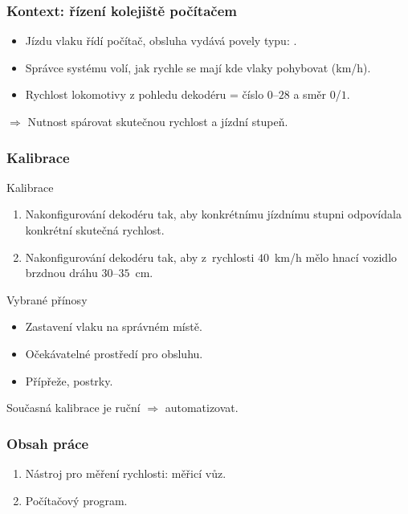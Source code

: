\documentclass[aspectratio=169]{beamer}
\begin{document}

\begin{frame}
\frametitle{Kontext: řízení kolejiště počítačem}
\begin{itemize}
\item Jízdu vlaku řídí počítač, obsluha vydává povely typu: .
\item Správce systému volí, jak rychle se mají kde vlaky pohybovat (km/h).
\item Rychlost lokomotivy z pohledu dekodéru = číslo $0$--$28$ a směr $0$/$1$.
\end{itemize}
$\Rightarrow$ Nutnost spárovat skutečnou rychlost a jízdní stupeň.
\end{frame}


\begin{frame}
\frametitle{Kalibrace}
\begin{block}{Kalibrace}
\begin{enumerate}
\item Nakonfigurování dekodéru tak, aby konkrétnímu jízdnímu stupni odpovídala
konkrétní skutečná rychlost.
\item Nakonfigurování dekodéru tak, aby z~rychlosti $40$~km/h mělo hnací vozidlo
brzdnou dráhu $30$--$35$~cm.
\end{enumerate}
\end{block}

\pause

\begin{block}{Vybrané přínosy}
\begin{itemize}
\item Zastavení vlaku na správném místě.
\item Očekávatelné prostředí pro obsluhu.
\item Přípřeže, postrky.
\end{itemize}
\end{block}

Současná kalibrace je ruční $\Rightarrow$ automatizovat.
\end{frame}


\begin{frame}
\frametitle{Obsah práce}
\begin{enumerate}
\item Nástroj pro měření rychlosti: měřicí vůz.
\item Počítačový program.
\end{enumerate}
\end{frame}
\end{document}
